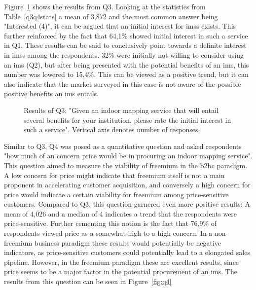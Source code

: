 Figure~\ref{fig:q3} shows the results from Q3. Looking at the statistics from Table~\ref{q3q4stats} a mean of 3,872 and the most common answer being "Interested (4)", it can be argued that an initial interest for \glspl{ims} exists. This further reinforced by the fact that 64,1\% showed initial interest in such a service in Q1. These results can be said to conclusively point towards a definite interest in \glspl{ims} among the respondents. 32\% were initially not willing to consider using an \gls{ims} (Q2), but after being presented with the potential benefits of an \gls{ims}, this number was lowered to 15,4\%. This can be viewed as a positive trend, but it can also indicate that the market surveyed in this case is not aware of the possible positive benefits an \gls{ims} entails.


\begin{figure}
    \centering
    \caption{Results of Q3: "Given an indoor mapping service that will entail several benefits for your institution, please rate the initial interest in such a service". Vertical axis denotes number of responses.}
    \label{fig:q3}
\end{figure}



Similar to Q3, Q4 was posed as a quantitative question and asked respondents "how much of an concern price would be in procuring an indoor mapping service". This question aimed to measure the viability of freemium in the \gls{b2bc} paradigm. A low concern for price might indicate that freemium itself is not a main proponent in accelerating customer acquisition, and conversely a high concern for price would indicate a certain viability for freemium among price-sensitive customers. Compared to Q3, this question garnered even more positive results: A mean of 4,026 and a median of 4 indicates a trend that the respondents were price-sensitive. Further cementing this notion is the fact that 76,9\% of respondents viewed price as a somewhat high to a high concern. In a non-freemium business paradigm these results would potentially be negative indicators, as price-sensitive customers could potentially lead to a elongated sales pipeline. However, in the freemium paradigm these are excellent results, since price seems to be a major factor in the potential procurement of an \gls{ims}. The results from this question can be seen in Figure~\ref{fig:q4}



